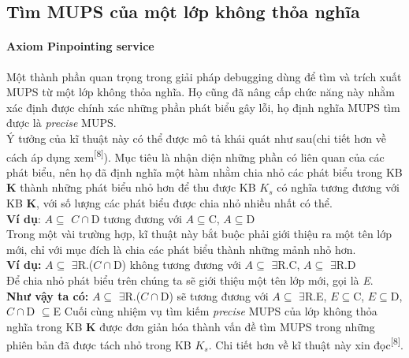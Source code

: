 \subsection{Tìm MUPS của một lớp không thỏa nghĩa}
\paragraph{Axiom Pinpointing service} Một thành phần quan trọng trong giải pháp debugging dùng để tìm và trích xuất MUPS từ một lớp không thỏa nghĩa. Họ cũng đã nâng cấp chức năng này nhằm xác định được chính xác những phần phát biểu gây lỗi, họ định nghĩa  
MUPS tìm được là \textit{precise} MUPS.
\\
Ý tưởng của kĩ thuật này có thể được mô tả khái quát như sau(chi tiết hơn về cách áp dụng xem\textsuperscript{[8]}). Mục tiêu là nhận diện những phần có liên quan của các phát biểu, nên họ đã định nghĩa một hàm nhằm chia nhỏ các phát biểu trong KB \textbf{K} thành những phát biểu nhỏ hơn để thu được KB $K_{s}$ có nghĩa tương đương với KB \textbf{K}, với số lượng các phát biểu được chia nhỏ nhiều nhất có thể.
\\\textbf{Ví dụ}:	 $A\subseteq$ $C\cap$D tương đương với $A\subseteq$C, $A\subseteq$D
\\
Trong một vài trường hợp, kĩ thuật này bắt buộc phải giới thiệu ra một tên lớp mới, chỉ với mục đích là chia các phát biểu thành những mảnh nhỏ hơn.
\\\textbf{Ví dụ:}	$A\subseteq$ $\exists$R.($C\cap$D) không tương đương với $A\subseteq$ $\exists$R.C, $A\subseteq$ $\exists$R.D
\\Để chia nhỏ phát biểu trên chúng ta sẽ giới thiệu một tên lớp mới, gọi là \textit{E}.
\\\textbf{Như vậy ta có:}
$A\subseteq$ $\exists$R.($C\cap$D) sẽ tương đương với $A\subseteq$ $\exists$R.E, $E\subseteq$C, $E\subseteq$D, $C\cap$D $\subseteq$E
Cuối cùng nhiệm vụ tìm kiếm \textit{precise} MUPS của lớp không thỏa nghĩa trong KB \textbf{K} được đơn giản hóa thành vấn đề tìm MUPS trong những phiên bản đã được tách nhỏ trong KB $K_{s}$. Chi tiết hơn về kĩ thuật này xin đọc\textsuperscript{[8]}.
